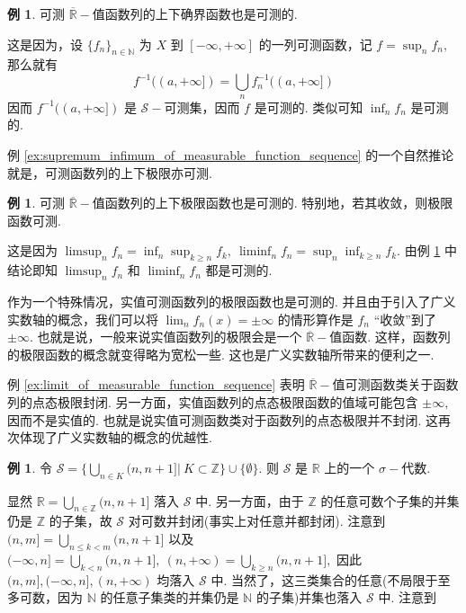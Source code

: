 \documentclass[12pt, a4paper, oneside]{book}
\numberwithin{figure}{section}
\theoremstyle{definition}
\newtheorem{example}[theorem]{例}
\begin{document}
\begin{example}\label{ex:supremum_infimum_of_measurable_function_sequence}
    可测 $\overline{\mathbb R}-$值函数列的上下确界函数也是可测的.
\end{example}
这是因为，设 $\{f_n\}_{n\in\mathbb N}$ 为 $X$ 到 $[-\infty,+\infty]$ 的一列可测函数，记 $f=\sup_n f_n,$
那么就有
\begin{equation}
    f^{-1}((a,+\infty])=\bigcup_n f_n^{-1}((a,+\infty])
\end{equation}
因而 $f^{-1}((a,+\infty])$ 是 $\mathcal S-$可测集，因而 $f$ 是可测的. 类似可知 $\inf_n f_n$ 是可测的.

例 \eqref{ex:supremum_infimum_of_measurable_function_sequence} 的一个自然推论就是，可测函数列的上下极限亦可测.
\begin{example}\label{ex:limit_of_measurable_function_sequence}
    可测 $\overline{\mathbb R}-$值函数列的上下极限函数也是可测的. 特别地，若其收敛，则极限函数可测.
\end{example}
这是因为 $\limsup_n f_n=\inf_n \sup_{k\geq n} f_k,\ \liminf_n f_n=\sup_n \inf_{k\geq n} f_k.$ 由例 \ref{ex:supremum_infimum_of_measurable_function_sequence} 中结论即知 $\limsup_n f_n$ 和 $\liminf_n f_n$ 都是可测的. 

作为一个特殊情况，实值可测函数列的极限函数也是可测的. 并且由于引入了广义实数轴的概念，我们可以将 $\lim_n f_n(x)=\pm\infty$ 的情形算作是 $f_n$ ``收敛''到了 $\pm\infty.$ 也就是说，一般来说实值函数列的极限会是一个 $\overline{\mathbb R}-$值函数. 
这样，函数列的极限函数的概念就变得略为宽松一些. 这也是广义实数轴所带来的便利之一.

例 \eqref{ex:limit_of_measurable_function_sequence} 表明 $\overline{\mathbb R}-$值可测函数类关于函数列的点态极限封闭. 另一方面，实值函数列的点态极限函数的值域可能包含 $\pm\infty,$ 因而不是实值的. 也就是说实值可测函数类对于函数列的点态极限并不封闭. 这再次体现了广义实数轴的概念的优越性.

\begin{example}\label{ex:sigma_algebra_partition}
    令 $\mathcal S=\{\bigcup_{n\in K}(n,n+1]|\ K\subset\mathbb Z\}\cup\{\emptyset\}.$ 则 $\mathcal S$ 是 $\mathbb R$ 上的一个 $\sigma-$代数.
\end{example}
显然 $\mathbb R=\bigcup_{n\in\mathbb Z}(n,n+1]$ 落入 $\mathcal S$ 中. 另一方面，由于 $\mathbb Z$ 的任意可数个子集的并集仍是 $\mathbb Z$ 的子集，故 
$\mathcal S$ 对可数并封闭(事实上对任意并都封闭).
注意到 
$(n,m]=\bigcup_{n\leq k<m}(n,n+1]$ 以及 $(-\infty,n]=\bigcup_{k<n}(n,n+1],\ (n,+\infty)=\bigcup_{k\geq n}(n,n+1],$ 因此 $(n,m],(-\infty,n],(n,+\infty)$ 均落入 $\mathcal S$ 中.
当然了，这三类集合的任意(不局限于至多可数，因为 $\mathbb N$ 的任意子集类的并集仍是 $\mathbb N$ 的子集)并集也落入 $\mathcal S$ 中. 注意到
\end{document}
